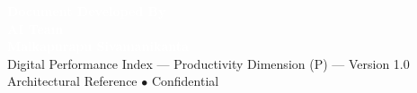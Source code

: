 \documentclass[11pt,a4paper]{article}
\begin{document}
\vspace{1cm}
\begin{tcolorbox}[enhanced, colback=dpiblue, colframe=dpiblue, boxrule=0pt, arc=2mm]
\begin{center}
\textcolor{white}{\textbf{\Large Document Developed By}}\\[0.15cm]
\textcolor{white}{\textbf{\Large AI Team}}\\[0.15cm]
\textcolor{white}{\textbf{\Large Malkapurapu Sivamanikanta}}\\[0.3cm]
\textcolor{dpicloud}{\small Digital Performance Index --- Productivity Dimension (P) --- Version 1.0}\\[0.1cm]
\textcolor{dpicloud}{\small Architectural Reference $\bullet$ Confidential}
\end{center}
\end{tcolorbox}
\end{document}
